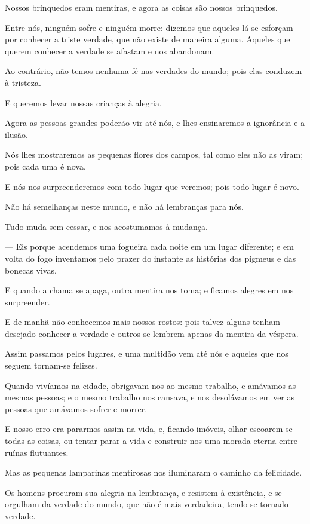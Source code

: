 Nossos brinquedos eram mentiras, e agora as coisas são nossos
brinquedos.

Entre nós, ninguém sofre e ninguém morre: dizemos que aqueles lá se
esforçam por conhecer a triste verdade, que não existe de maneira alguma.
Aqueles que querem conhecer a verdade se afastam e nos abandonam.

Ao contrário, não temos nenhuma fé nas verdades do mundo; pois elas
conduzem à tristeza.

E queremos levar nossas crianças à alegria.

Agora as pessoas grandes poderão vir até nós, e lhes ensinaremos a
ignorância e a ilusão.

Nós lhes mostraremos as pequenas flores dos campos, tal como eles não
as viram; pois cada uma é nova.

E nós nos surpreenderemos com todo lugar que veremos; pois todo lugar é
novo.

Não há semelhanças neste mundo, e não há lembranças para nós.

Tudo muda sem cessar, e nos acostumamos à mudança.

--- Eis porque acendemos uma fogueira cada noite em um lugar diferente;
e em volta do fogo inventamos pelo prazer do instante as histórias dos
pigmeus e das bonecas vivas.

E quando a chama se apaga, outra mentira nos toma; e ficamos alegres em
nos surpreender.

E de manhã não conhecemos mais nossos rostos: pois talvez alguns tenham
desejado conhecer a verdade e outros se lembrem apenas da mentira da
véspera.

Assim passamos pelos lugares, e uma multidão vem até nós e aqueles que
nos seguem tornam-se felizes.

Quando vivíamos na cidade, obrigavam-nos ao mesmo trabalho, e amávamos
as mesmas pessoas; e o mesmo trabalho nos cansava, e nos desolávamos em
ver as pessoas que amávamos sofrer e morrer.

E nosso erro era pararmos assim na vida, e, ficando imóveis, olhar
escoarem-se todas as coisas, ou tentar parar a vida e construir-nos uma
morada eterna entre ruínas flutuantes.

Mas as pequenas lamparinas mentirosas nos iluminaram o caminho da
felicidade.

Os homens procuram sua alegria na lembrança, e resistem à existência, e
se orgulham da verdade do mundo, que não é mais verdadeira, tendo se
tornado verdade.

